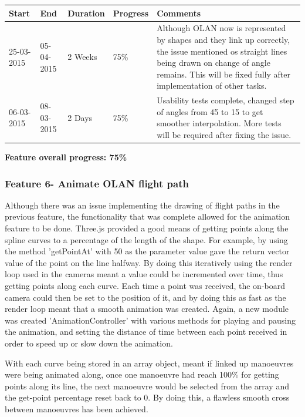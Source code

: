 \begin{table}[h]
\begin{tabular}{|l|l|l|l|p{7cm}|}
\hline
\textbf{Start} & \textbf{End} & \textbf{Duration} & \textbf{Progress} & \textbf{Comments}                                                                                                     \\ \hline
25-03-2015     & 05-04-2015   & 2 Weeks            & 75\%             &  Although OLAN now is represented by shapes and they link up correctly, the issue mentioned os straight lines being drawn on change of angle remains. This will be fixed fully after implementation of other tasks.\\ \hline
06-03-2015     & 08-03-2015   & 2 Days            & 75\%             &  Usability tests complete, changed step of angles from 45 to 15 to get smoother interpolation. More tests will be required after fixing the issue.\\ \hline
\end{tabular}
\end{table}

\textbf{Feature overall progress: 75\%}

\subsubsection{Feature 6- Animate OLAN flight path}
Although there was an issue implementing the drawing of flight paths in the previous feature, the functionality that was complete allowed for the animation feature to be done. Three.js provided a good means of getting points along the spline curves to a percentage of the length of the shape. For example, by using the method 'getPointAt' with 50 as the parameter value gave the return vector value of the point on the line halfway. By doing this iteratively using the render loop used in the cameras meant a value could be incremented over time, thus getting points along each curve. Each time a point was received, the on-board camera could then be set to the position of it, and by doing this as fast as the render loop meant that a smooth animation was created. Again, a new module was created 'AnimationController' with various methods for playing and pausing the animation, and setting the distance of time between each point received in order to speed up or slow down the animation.

With each curve being stored in an array object, meant if linked up manoeuvres were being animated along, once one manoeuvre had reach 100\% for getting points along its line, the next manoeuvre would be selected from the array and the get-point percentage reset back to 0. By doing this, a flawless smooth cross between manoeuvres has been achieved.

